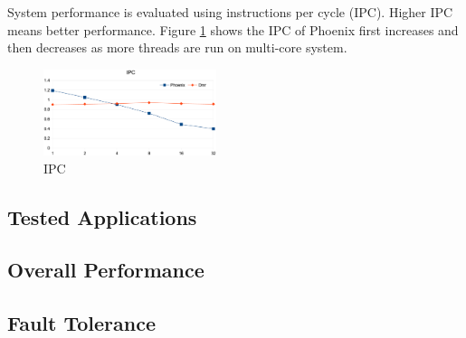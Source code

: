 System performance is evaluated using
instructions per cycle (IPC). Higher IPC means
better performance.
Figure \ref{fig:perf:ipc} shows the IPC of Phoenix first increases 
and then decreases as more threads are run on multi-core system.


\begin{figure}[!h!t]  
    \centering
    \includegraphics[width=0.45\textwidth]{eps/perf_ipc.eps}
    \caption{IPC}
    \label{fig:perf:ipc}
\end{figure}


\subsection{Tested Applications}


\subsection{Overall Performance}

\subsection{Fault Tolerance}
